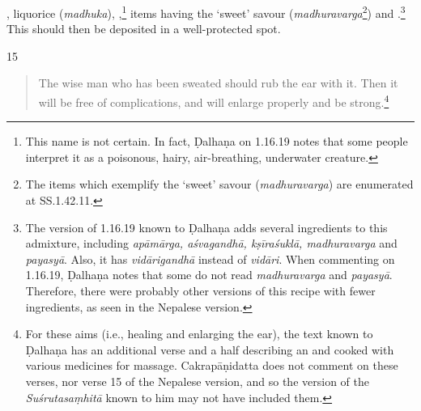 \begin{translation}
    ,
    liquorice (\emph{madhuka}),
    ,\footnote{This name is not
    certain. In fact, Ḍalhaṇa on 1.16.19 \citep[79]{vulgate} notes that some people interpret
    it as a poisonous, hairy, air-breathing, underwater creature.}
    items having the `sweet' savour (\emph{madhuravarga}\footnote{The
    items which exemplify the `sweet' savour \label{kakolyadi}
    (\emph{madhuravarga}) are enumerated at SS.1.42.11.}) and .\footnote{The version of 1.16.19 known to Ḍalhaṇa \citep[79]{vulgate} adds several ingredients to this admixture, including \emph{apāmārga, aśvagandhā, kṣīraśuklā, madhuravarga} and \emph{payasyā}. Also, it has \emph{vidārigandhā} instead of \emph{vidāri}. When commenting on 1.16.19, Ḍalhaṇa \citep[79]{vulgate} notes that some do not read \emph{madhuravarga} and \emph{payasyā}. Therefore, there were probably other versions of this recipe with fewer ingredients, as seen in the Nepalese version.}
    This should then be deposited in a well-protected spot.
    
    \item[15]%
    \begin{verse}
        
        The wise man who has been sweated should rub the  ear with 
        it. 
        Then it will be free of complications, and will enlarge properly and be strong.\footnote{For these aims (i.e., healing and enlarging the ear), the text known to Ḍalhaṇa \citep[79]{vulgate} has an additional verse and a half describing an  and  cooked with various medicines for massage. Cakrapāṇidatta \citep[131]{acar-1939} does not comment on these verses, nor verse 15 of the Nepalese version, and so the version of the \emph{Suśrutasaṃhitā} known to him may not have included them.}
    \end{verse}
    

\end{translation}
